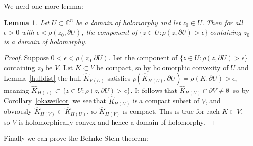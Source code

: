 \documentclass[11pt,a4paper, final, twoside]{article}
\newtheorem{lemma}[theorem]{Lemma}
\numberwithin{equation}{section}
\newcommand{\C}{\mathbb C}
\newcommand{\bd}{\partial}
\newcommand{\pmetric}{\rho}
\newcommand{\hol}{H}
\begin{document}
We need one more lemma:
\begin{lemma}
\label{vlemma}
Let $U\subset\C^n$ be a domain of holomorphy and let $z_0\in U$. Then for all $\epsilon>0$ with $\epsilon<\pmetric(z_0,\bd U)$, the component of $\{z\in U\colon \pmetric(z,\bd U)>\epsilon\}$
containing $z_0$ is a domain of holomorphy.
\end{lemma}
\begin{proof}
Suppose $0<\epsilon<\pmetric(z_0,\bd U)$.
Let the component of $\{z\in U\colon \pmetric(z,\bd U)>\epsilon\}$ containing $z_0$ be $V$. Let $K\subset V$ be compact, so by holomorphic convexity of $U$ and Lemma~\ref{hulldist}
the hull $\hat K_{\hol(U)}$ satisfies $\pmetric(\hat K_{\hol(U)},\bd U)=\pmetric(K,\bd U)>\epsilon$, meaning $\hat K_{\hol(U)}\subset \{z\in U\colon\pmetric(z,\bd U)>\epsilon\}$. 
It follows that $\hat K_{\hol(U)}\cap \bd V\neq\emptyset$,
so by Corollary~\ref{okaweilcor} we see that $\hat K_{\hol(U)}$ is a compact subset of $V$,
and obviously $\hat K_{\hol(V)}\subset\hat K_{\hol(U)}$, so $\hat K_{\hol(V)}$ is compact. This is true for each $K\subset V$, so $V$ is holomorphically convex and hence a domain of holomorphy.
\end{proof}
Finally we can prove the Behnke-Stein theorem:
\end{document}
